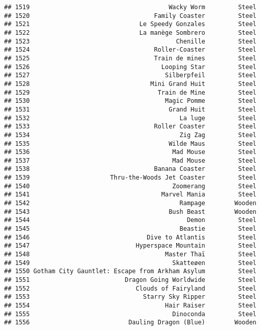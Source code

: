 \documentclass[
]{article}
\begin{document}
\begin{verbatim}
## 1519                                      Wacky Worm         Steel
## 1520                                  Family Coaster         Steel
## 1521                              Le Speedy Gonzales         Steel
## 1522                              La manège Sombrero         Steel
## 1523                                        Chenille         Steel
## 1524                                  Roller-Coaster         Steel
## 1525                                  Train de mines         Steel
## 1526                                    Looping Star         Steel
## 1527                                     Silberpfeil         Steel
## 1528                                 Mini Grand Huit         Steel
## 1529                                   Train de Mine         Steel
## 1530                                     Magic Pomme         Steel
## 1531                                      Grand Huit         Steel
## 1532                                         La luge         Steel
## 1533                                  Roller Coaster         Steel
## 1534                                         Zig Zag         Steel
## 1535                                      Wilde Maus         Steel
## 1536                                       Mad Mouse         Steel
## 1537                                       Mad Mouse         Steel
## 1538                                  Banana Coaster         Steel
## 1539                      Thru-the-Woods Jet Coaster         Steel
## 1540                                       Zoomerang         Steel
## 1541                                    Marvel Mania         Steel
## 1542                                         Rampage        Wooden
## 1543                                      Bush Beast        Wooden
## 1544                                           Demon         Steel
## 1545                                         Beastie         Steel
## 1546                                Dive to Atlantis         Steel
## 1547                             Hyperspace Mountain         Steel
## 1548                                     Master Thaï         Steel
## 1549                                       Skatteøen         Steel
## 1550 Gotham City Gauntlet: Escape from Arkham Asylum         Steel
## 1551                          Dragon Going Worldwide         Steel
## 1552                             Clouds of Fairyland         Steel
## 1553                               Starry Sky Ripper         Steel
## 1554                                     Hair Raiser         Steel
## 1555                                       Dinoconda         Steel
## 1556                           Dauling Dragon (Blue)        Wooden

\end{verbatim}
\end{document}
